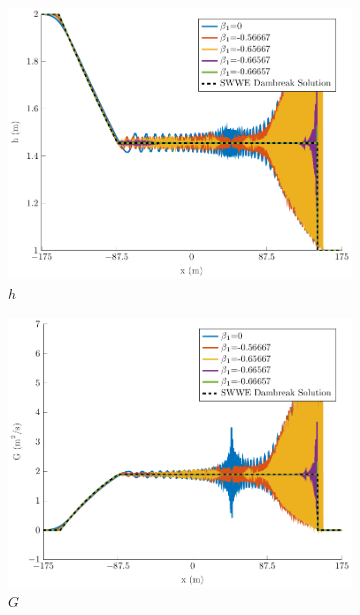 \documentclass[10pt]{article}
\begin{document}
\begin{figure}
	\centering
	\begin{subfigure}{0.32\textwidth}
		\centering
		\includegraphics[width=\textwidth]{./Figures/Simulations/Study/Serre2SWWECloser/h.pdf}
		\caption{$h$}
	\end{subfigure}
	\begin{subfigure}{0.32\textwidth}
		\centering
		\includegraphics[width=\textwidth]{./Figures/Simulations/Study/Serre2SWWECloser/G.pdf}
		\caption{$G$}
	\end{subfigure}
	\begin{subfigure}{0.32\textwidth}
	\centering

\end{subfigure}
\end{figure}
\end{document}

